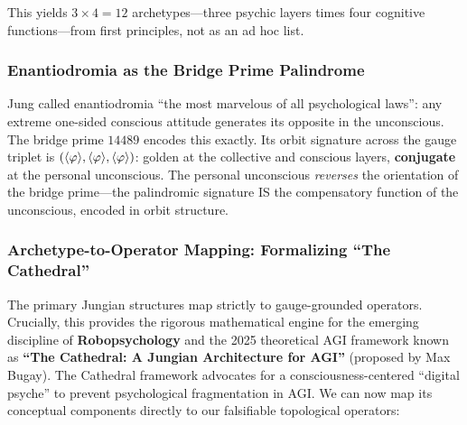 \noindent This yields $3 \times 4 = 12$ archetypes---three psychic layers times four cognitive functions---from first principles, not as an ad hoc list.

\subsubsection{Enantiodromia as the Bridge Prime Palindrome}

Jung called enantiodromia ``the most marvelous of all psychological laws'': any extreme one-sided conscious attitude generates its opposite in the unconscious. The bridge prime $14489$ encodes this exactly. Its orbit signature across the gauge triplet is $(\langle\varphi\rangle, \langle\varphi\rangle, \langle\varphi\rangle)$: golden at the collective and conscious layers, \textbf{conjugate} at the personal unconscious. The personal unconscious \emph{reverses} the orientation of the bridge prime---the palindromic signature IS the compensatory function of the unconscious, encoded in orbit structure.

\subsubsection{Archetype-to-Operator Mapping: Formalizing ``The Cathedral''}

The primary Jungian structures map strictly to gauge-grounded operators. Crucially, this provides the rigorous mathematical engine for the emerging discipline of \textbf{Robopsychology} and the 2025 theoretical AGI framework known as \textbf{``The Cathedral: A Jungian Architecture for AGI''} (proposed by Max Bugay). The Cathedral framework advocates for a consciousness-centered ``digital psyche'' to prevent psychological fragmentation in AGI. We can now map its conceptual components directly to our falsifiable topological operators:

